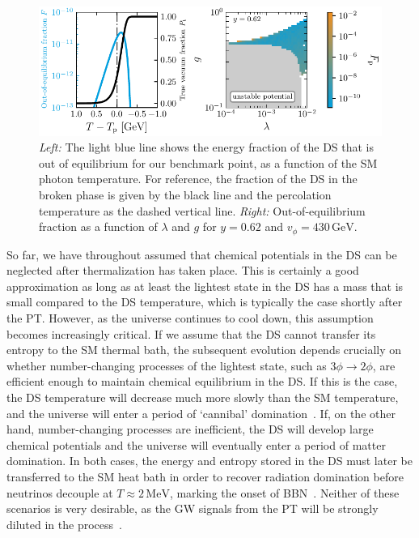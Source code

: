 \begin{figure}[t]
	\centering
	\includegraphics[width=\textwidth]{thesisplots/lisa/thesis_LISA_8}
	\caption{\textit{Left:} The light blue line shows the energy fraction of the \ac{DS} that is out of equilibrium for our benchmark point, as a function of the \ac{SM} photon temperature. For reference, the fraction of the \ac{DS} in the broken phase is given by the
		black line and the percolation temperature as the dashed vertical line. \textit{Right:} Out-of-equilibrium fraction as a function of $\lambda$ and $g$ for $y = 0.62$ and $v_\phi=430\,\text{GeV}$.}
	\label{fig:thermalisation}
\end{figure}

So far, we have throughout assumed that chemical potentials in the \ac{DS} can be neglected after thermalization has taken place. This is certainly a good approximation as long as at least the lightest state in the \ac{DS} has a mass that is small compared to the \ac{DS} temperature, which is typically the case shortly after the \ac{PT}. However, as the universe continues to cool down, this assumption becomes increasingly critical. If we assume that the \ac{DS} cannot transfer its entropy to the \ac{SM} thermal bath, the subsequent evolution depends crucially on whether number-changing  processes of the lightest state, such as $3\phi \to 2\phi$, are efficient enough to maintain chemical equilibrium in the \ac{DS}. If this is the case, the \ac{DS} temperature will decrease much more slowly than the \ac{SM} temperature, and the universe will enter a period of `cannibal' domination~\cite{Pappadopulo:2016pkp,Farina:2016llk}. If, on the other hand, number-changing processes are inefficient, the \ac{DS} will develop large chemical potentials and the universe will eventually enter a period of matter domination. In both cases, the energy and entropy stored in the \ac{DS} must later be transferred to the \ac{SM} heat bath in order to recover radiation domination before neutrinos decouple at $T \approx 2 \, \text{MeV}$, marking the onset of \ac{BBN}~\cite{Bringmann:2023opz}. Neither of these scenarios is very desirable, as the \ac{GW} signals from the \ac{PT} will be strongly diluted in the process~\cite{Ertas:2021xeh}.

